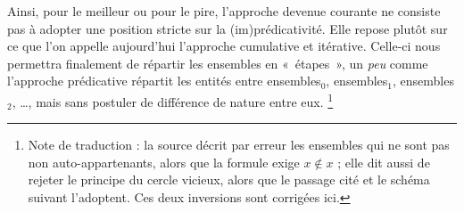 \documentclass[../../../include/open-logic-section]{subfiles}
\begin{document}
Ainsi, pour le meilleur ou pour le pire, l'approche devenue courante
ne consiste pas à adopter une position stricte sur la
(im)\-pré\-di\-ca\-ti\-vi\-té. Elle repose plutôt sur ce que l'on
appelle aujourd'hui l'approche cumulative et itérative. Celle-ci nous
permettra finalement de répartir les ensembles en «~étapes~», un
\emph{peu} comme l'approche prédicative répartit les entités entre
ensembles$_0$, ensembles$_1$, ensembles$_2$, \ldots, mais sans
postuler de différence de nature entre eux.
\footnote{Note de traduction : la source décrit par erreur les ensembles qui ne sont pas non auto-appartenants, alors que la formule exige $x\notin x$ ; elle dit aussi de rejeter le principe du cercle vicieux, alors que le passage cité et le schéma suivant l'adoptent. Ces deux inversions sont corrigées ici.}
\end{document}
